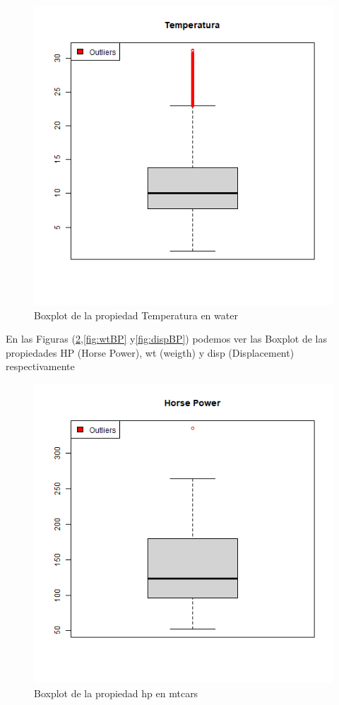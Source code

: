 \documentclass[sigconf]{acmart}
\begin{document}
	\begin{figure}
		\centering
		\includegraphics[width=0.7\linewidth]{img/temperatura.png}
		\caption{Boxplot de la propiedad Temperatura en water}
		\label{fig:temperaturaBP}
	\end{figure}
	
	
	En las Figuras (\ref{fig:hpBP},\ref{fig:wtBP} y\ref{fig:dispBP}) podemos ver las Boxplot de las propiedades HP (Horse Power), wt (weigth) y disp (Displacement) respectivamente
	
	\begin{figure}
		\centering
		\includegraphics[width=0.7\linewidth]{img/hpBoxplot.png}
		\caption{Boxplot de la propiedad hp en mtcars}
		\label{fig:hpBP}
	\end{figure}
	
\end{document}
